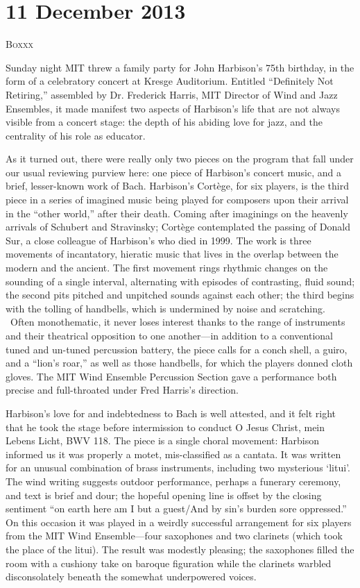 \chapter{11 December 2013}

\textsc{Boxxx}

Sunday night MIT threw a family party for John Harbison’s 75th birthday, in the form of a celebratory concert at Kresge Auditorium. Entitled “Definitely Not Retiring,” assembled by Dr. Frederick Harris, MIT Director of Wind and Jazz Ensembles, it made manifest two aspects of Harbison’s life that are not always visible from a concert stage: the depth of his abiding love for jazz, and the centrality of his role as educator.

As it turned out, there were really only two pieces on the program that fall under our usual reviewing purview here: one piece of Harbison’s concert music, and a brief, lesser-known work of Bach. Harbison’s Cortège, for six players, is the third piece in a series of imagined music being played for composers upon their arrival in the “other world,” after their death. Coming after imaginings on the heavenly arrivals of Schubert and Stravinsky; Cortège contemplated the passing of Donald Sur, a close colleague of Harbison’s who died in 1999. The work is three movements of incantatory, hieratic music that lives in the overlap between the modern and the ancient. The first movement rings rhythmic changes on the sounding of a single interval, alternating with episodes of contrasting, fluid sound; the second pits pitched and unpitched sounds against each other; the third begins with the tolling of handbells, which is undermined by noise and scratching.  Often monothematic, it never loses interest thanks to the range of instruments and their theatrical opposition to one another—in addition to a conventional tuned and un-tuned percussion battery, the piece calls for a conch shell, a guiro, and a “lion’s roar,” as well as those handbells, for which the players donned cloth gloves. The MIT Wind Ensemble Percussion Section gave a performance both precise and full-throated under Fred Harris’s direction.

Harbison’s love for and indebtedness to Bach is well attested, and it felt right that he took the stage before intermission to conduct O Jesus Christ, mein Lebens Licht, BWV 118. The piece is a single choral movement: Harbison informed us it was properly a motet, mis-classified as a cantata. It was written for an unusual combination of brass instruments, including two mysterious ‘litui’. The wind writing suggests outdoor performance, perhaps a funerary ceremony, and text is brief and dour; the hopeful opening line is offset by the closing sentiment “on earth here am I but a guest/And by sin's burden sore oppressed.” On this occasion it was played in a weirdly successful arrangement for six players from the MIT Wind Ensemble—four saxophones and two clarinets (which took the place of the litui). The result was modestly pleasing; the saxophones filled the room with a cushiony take on baroque figuration while the clarinets warbled disconsolately beneath the somewhat underpowered voices.

